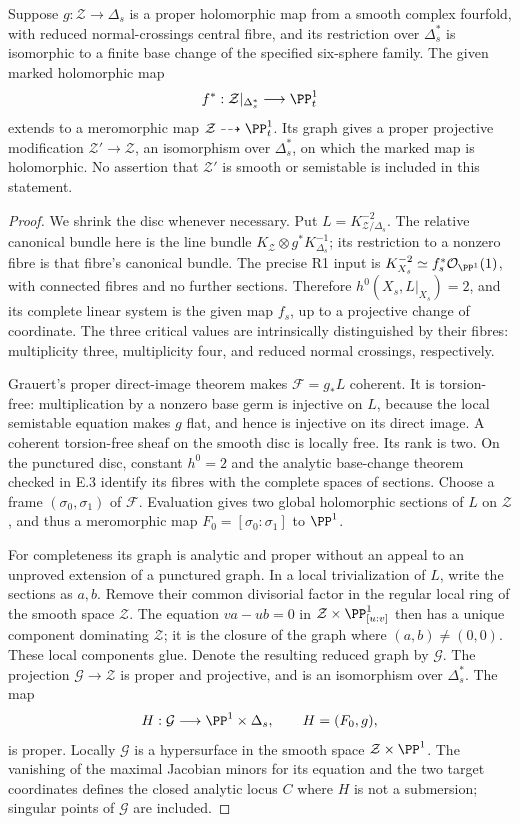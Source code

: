 \begin{proposition}
Suppose $g:\mathcal Z\to\Delta_s$ is a proper holomorphic map
from a smooth complex fourfold, with reduced normal-crossings
central fibre, and its restriction over $\Delta_s^*$ is
isomorphic to a finite base change of the specified six-sphere
family. The given marked holomorphic map
\[
 f^*:\mathcal Z|_{\Delta_s^*}\longrightarrow\PP^1_t
\]
extends to a meromorphic map $\mathcal Z\dashrightarrow\PP^1_t$.
Its graph gives a proper projective modification
$\mathcal Z'\to\mathcal Z$, an isomorphism over
$\Delta_s^*$, on which the marked map is holomorphic.
No assertion that $\mathcal Z'$ is smooth or semistable is
included in this statement.
\end{proposition}
\begin{proof}
We shrink the disc whenever necessary. Put
$L=K_{\mathcal Z/\Delta_s}^{-2}$. The relative canonical
bundle here is the line bundle
$K_{\mathcal Z}\otimes g^*K_{\Delta_s}^{-1}$; its
restriction to a nonzero fibre is that fibre's canonical bundle.
The precise R1 input is
$K_{X_s}^{-2}\simeq f_s^*\mathcal O_{\PP^1}(1)$,
with connected fibres and no further sections. Therefore
$h^0(X_s,L|_{X_s})=2$, and its complete linear system is
the given map $f_s$, up to a projective change of coordinate.
The three critical values are intrinsically distinguished by
their fibres: multiplicity three, multiplicity four, and reduced
normal crossings, respectively.

Grauert's proper direct-image theorem
\citep[Section 6, Hauptsatz I]{Grauert60push} makes
$\mathcal F=g_*L$ coherent. It is torsion-free: multiplication
by a nonzero base germ is injective on $L$, because the local
semistable equation makes $g$ flat, and hence is injective on
its direct image. A coherent torsion-free sheaf on the smooth
disc is locally free. Its rank is two. On the punctured disc,
constant $h^0=2$ and the analytic base-change theorem checked
in E.3 identify its fibres with the complete spaces of sections.
Choose a frame $(\sigma_0,\sigma_1)$ of $\mathcal F$.
Evaluation gives two global holomorphic sections of $L$ on
$\mathcal Z$, and thus a meromorphic map
$F_0=[\sigma_0:\sigma_1]$ to $\PP^1$.

For completeness its graph is analytic and proper without an
appeal to an unproved extension of a punctured graph. In a local
trivialization of $L$, write the sections as $a,b$. Remove their
common divisorial factor in the regular local ring of the smooth
space $\mathcal Z$. The equation
$v a-u b=0$ in $\mathcal Z\times\PP^1_{[u:v]}$
then has a unique component dominating $\mathcal Z$; it is
the closure of the graph where $(a,b)\ne(0,0)$. These local
components glue. Denote the resulting reduced graph by
$\mathcal G$. The projection $\mathcal G\to\mathcal Z$
is proper and projective, and is an isomorphism over
$\Delta_s^*$. The map
\[
 H:\mathcal G\longrightarrow\PP^1\times\Delta_s,
 \qquad H=(F_0,g),
\]
is proper. Locally $\mathcal G$ is a hypersurface in the smooth
space $\mathcal Z\times\PP^1$. The vanishing of the maximal
Jacobian minors for its equation and the two target coordinates
defines the closed analytic locus $C$ where $H$ is not a
submersion; singular points of $\mathcal G$ are included.


\end{proof}
